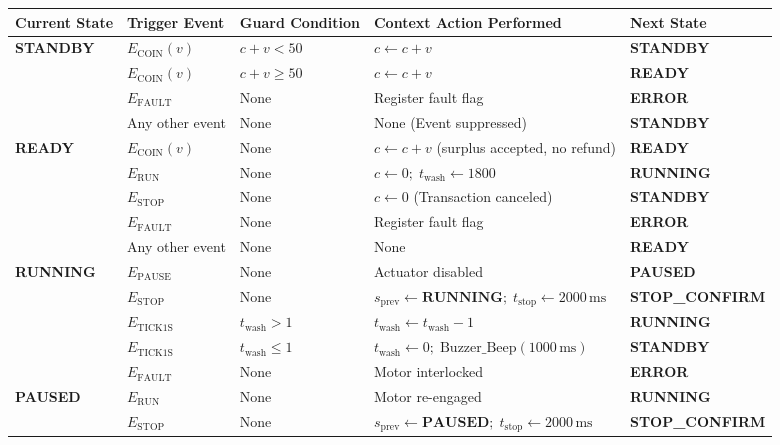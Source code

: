 \documentclass[12pt]{article}
\begin{document}
\begin{table}[H]
\centering
\scriptsize
\renewcommand{\arraystretch}{1.25}
\begin{tabularx}{\textwidth}{l l l X l}
\toprule
\textbf{Current State} & \textbf{Trigger Event} & \textbf{Guard Condition} & \textbf{Context Action Performed} & \textbf{Next State} \\
\midrule
\multirow{4}{*}{\textbf{STANDBY}} 
  & $E_{\text{COIN}}(v)$ & $c + v < 50$ & $c \leftarrow c + v$ & \textbf{STANDBY} \\
  & $E_{\text{COIN}}(v)$ & $c + v \ge 50$ & $c \leftarrow c + v$ & \textbf{READY} \\
  & $E_{\text{FAULT}}$ & None & Register fault flag & \textbf{ERROR} \\
  & Any other event & None & None (Event suppressed) & \textbf{STANDBY} \\
\midrule
\multirow{5}{*}{\textbf{READY}} 
  & $E_{\text{COIN}}(v)$ & None & $c \leftarrow c + v$ (surplus accepted, no refund) & \textbf{READY} \\
  & $E_{\text{RUN}}$ & None & $c \leftarrow 0;\; t_{\text{wash}} \leftarrow 1800$ & \textbf{RUNNING} \\
  & $E_{\text{STOP}}$ & None & $c \leftarrow 0$ (Transaction canceled) & \textbf{STANDBY} \\
  & $E_{\text{FAULT}}$ & None & Register fault flag & \textbf{ERROR} \\
  & Any other event & None & None & \textbf{READY} \\
\midrule
\multirow{5}{*}{\textbf{RUNNING}} 
  & $E_{\text{PAUSE}}$ & None & Actuator disabled & \textbf{PAUSED} \\
  & $E_{\text{STOP}}$ & None & $s_{\text{prev}} \leftarrow \mathbf{RUNNING};\; t_{\text{stop}} \leftarrow 2000\,\text{ms}$ & \textbf{STOP\_CONFIRM} \\
  & $E_{\text{TICK1S}}$ & $t_{\text{wash}} > 1$ & $t_{\text{wash}} \leftarrow t_{\text{wash}} - 1$ & \textbf{RUNNING} \\
  & $E_{\text{TICK1S}}$ & $t_{\text{wash}} \le 1$ & $t_{\text{wash}} \leftarrow 0;\; \text{Buzzer\_Beep}(1000\,\text{ms})$ & \textbf{STANDBY} \\
  & $E_{\text{FAULT}}$ & None & Motor interlocked & \textbf{ERROR} \\
\midrule
\multirow{5}{*}{\textbf{PAUSED}} 
  & $E_{\text{RUN}}$ & None & Motor re-engaged & \textbf{RUNNING} \\
  & $E_{\text{STOP}}$ & None & $s_{\text{prev}} \leftarrow \mathbf{PAUSED};\; t_{\text{stop}} \leftarrow 2000\,\text{ms}$ & \textbf{STOP\_CONFIRM} \\

\end{tabularx}
\end{table}
\end{document}
